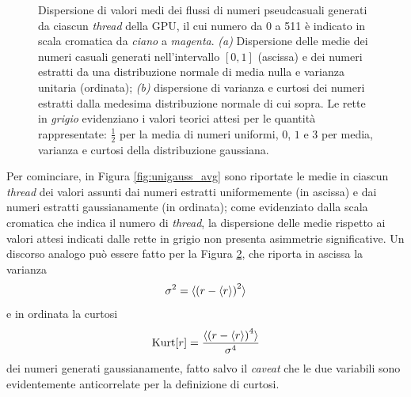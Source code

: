 \begin{figure}[t]
\begin{subfigure}{.5\textwidth}
  \caption{}
  \label{fig:variance_kurt}
\end{subfigure}
\caption{Dispersione di valori medi dei flussi di numeri pseudcasuali generati da ciascun \textit{thread} della GPU, il cui numero da 0 a 511 è indicato in scala cromatica da \textit{ciano} a \textit{magenta}. \textit{(a)} Dispersione delle medie dei numeri casuali generati nell'intervallo $[0,1]$ (ascissa) e dei numeri estratti da una distribuzione normale di media nulla e varianza unitaria (ordinata); \textit{(b)} dispersione di varianza e curtosi dei numeri estratti dalla medesima distribuzione normale di cui sopra. Le rette in \textit{grigio} evidenziano i valori teorici attesi per le quantità rappresentate: $\frac{1}{2}$ per la media di numeri uniformi, $0$, $1$ e $3$ per media, varianza e curtosi della distribuzione gaussiana.} 
\end{figure}

Per cominciare, in Figura \ref{fig:unigauss_avg} sono riportate le medie in ciascun \textit{thread} dei valori assunti dai numeri estratti uniformemente (in ascissa) e dai numeri estratti gaussianamente (in ordinata); come evidenziato dalla scala cromatica che indica il numero di \textit{thread}, la dispersione delle medie rispetto ai valori attesi indicati dalle rette in grigio non presenta asimmetrie significative. Un discorso analogo può essere fatto per la Figura \ref{fig:variance_kurt}, che riporta in ascissa la varianza
\begin{equation}
    \sigma^2 = \braket{{\left(r-\braket{r}\right)}^2}
    \label{eq:variance}
\end{equation}
e in ordinata la curtosi
\begin{equation}
    \text{Kurt}[r] = \frac{\braket{{\left(r-\braket{r}\right)}^4}}{\sigma^4}
    \label{eq:kurtosis}
\end{equation}
dei numeri generati gaussianamente, fatto salvo il \textit{caveat} che le due variabili sono evidentemente anticorrelate per la definizione di curtosi.

